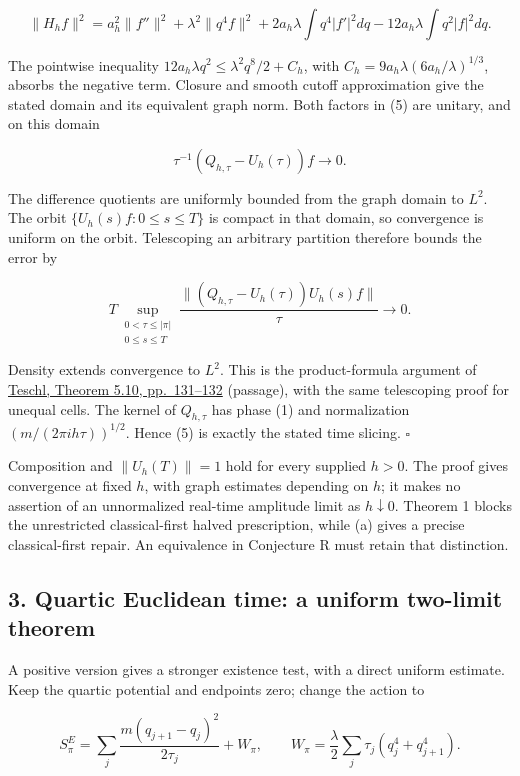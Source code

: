 \documentclass[11pt,a4paper]{article}
\begin{document}
\[
\|H_h f\|^2=a_h^2\|f''\|^2+\lambda^2\|q^4f\|^2
+2a_h\lambda\int q^4|f'|^2dq
-12a_h\lambda\int q^2|f|^2dq.
\]

The pointwise inequality \(12a_h\lambda q^2\le\lambda^2q^8/2+C_h\), with
\(C_h=9a_h\lambda(6a_h/\lambda)^{1/3}\), absorbs the negative term.
Closure and smooth cutoff approximation give the stated domain and its
equivalent graph norm. Both factors in (5) are unitary, and on this
domain

\[
\tau^{-1}(Q_{h,\tau}-U_h(\tau))f\longrightarrow0.
\]

The difference quotients are uniformly bounded from the graph domain to
\(L^2\). The orbit \(\{U_h(s)f:0\le s\le T\}\) is compact in that
domain, so convergence is uniform on the orbit. Telescoping an arbitrary
partition therefore bounds the error by

\[
T\sup_{\substack{0<\tau\le|\pi|\\0\le s\le T}}
\frac{\|(Q_{h,\tau}-U_h(\tau))U_h(s)f\|}{\tau}\longrightarrow0.
\]

Density extends convergence to \(L^2\). This is the product-formula
argument of
\href{https://www.mat.univie.ac.at/~gerald/ftp/book-schroe/schroe.pdf}{Teschl,
Theorem 5.10, pp.~131--132} (passage), with the same telescoping proof
for unequal cells. The kernel of \(Q_{h,\tau}\) has phase (1) and
normalization \((m/(2\pi i h\tau))^{1/2}\). Hence (5) is exactly the
stated time slicing. \(\square\)

Composition and \(\|U_h(T)\|=1\) hold for every supplied \(h>0\). The
proof gives convergence at fixed \(h\), with graph estimates depending
on \(h\); it makes no assertion of an unnormalized real-time amplitude
limit as \(h\downarrow0\). Theorem 1 blocks the unrestricted
classical-first halved prescription, while (a) gives a precise
classical-first repair. An equivalence in Conjecture R must retain that
distinction.

\hypertarget{quartic-euclidean-time-a-uniform-two-limit-theorem}{%
\subsection{3. Quartic Euclidean time: a uniform two-limit
theorem}\label{quartic-euclidean-time-a-uniform-two-limit-theorem}}

A positive version gives a stronger existence test, with a direct
uniform estimate. Keep the quartic potential and endpoints zero; change
the action to

\[
S^E_\pi=\sum_j\frac{m(q_{j+1}-q_j)^2}{2\tau_j}+W_\pi,
\qquad W_\pi=\frac\lambda2\sum_j\tau_j(q_j^4+q_{j+1}^4).
\]
\end{document}
